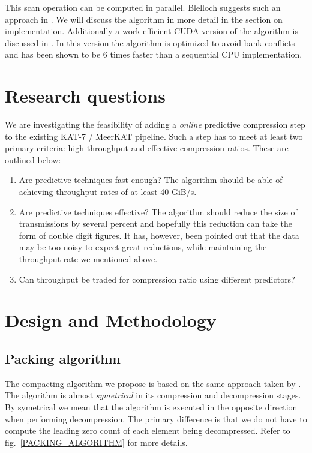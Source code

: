 \documentclass{acm_proc_article-sp}
\begin{document}
This scan operation can be computed in parallel. Blelloch suggests such an approach in \cite{blelloch1990prefix}. We will discuss the algorithm in more detail in the section on implementation.
Additionally a work-efficient CUDA version of the algorithm is discussed in \cite{harris2007parallel}. In this version the algorithm is optimized to avoid bank conflicts and has been
shown to be 6 times faster than a sequential CPU implementation.
\section{Research questions}
We are investigating the feasibility of adding a \textit{online} predictive compression step to the existing KAT-7 / MeerKAT pipeline. Such a step has to meet at least two primary
criteria: high throughput and effective compression ratios. These are outlined below:
\begin{enumerate}
 \item Are predictive techniques fast enough? The algorithm should be able of achieving throughput rates of at least 40 GiB/s.
 \item Are predictive techniques effective? The algorithm should reduce the size of transmissions by several percent and hopefully
       this reduction can take the form of double digit figures. It has, however, been pointed out that the data may
       be too noisy to expect great reductions, while maintaining the throughput rate we mentioned above.
 \item Can throughput be traded for compression ratio using different predictors?
\end{enumerate}
\section{Design and Methodology}
\subsection{Packing algorithm}
The compacting algorithm we propose is based on the same approach taken by \cite{O'Neil:2011:FDC:1964179.1964189}. The algorithm is almost \textit{symetrical} in its compression and 
decompression stages. By symetrical we mean that  the algorithm is executed in the opposite direction when performing decompression. The primary difference is that we do not have to compute
the leading zero count of each element being decompressed. Refer to fig.~\ref{PACKING_ALGORITHM} for more details.
\end{document}
